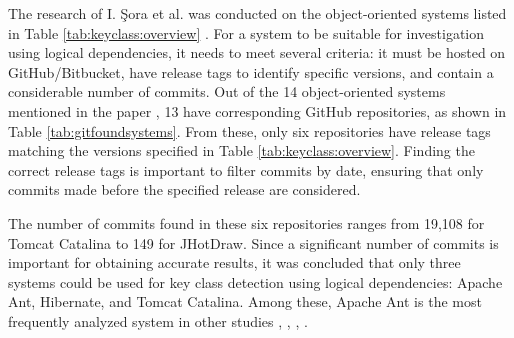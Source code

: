 \hspace{4em}The research of I. Şora et al. \cite{Finding-key-classes} was conducted on the object-oriented systems listed in Table \ref{tab:keyclass:overview} \cite{b4}. For a system to be suitable for investigation using logical dependencies, it needs to meet several criteria: it must be hosted on GitHub/Bitbucket, have release tags to identify specific versions, and contain a considerable number of commits. Out of the 14 object-oriented systems mentioned in the paper \cite{Finding-key-classes}, 13 have corresponding GitHub repositories, as shown in Table \ref{tab:gitfoundsystems}. From these, only six repositories have release tags matching the versions specified in Table \ref{tab:keyclass:overview}. Finding the correct release tags is important to filter commits by date, ensuring that only commits made before the specified release are considered.

The number of commits found in these six repositories ranges from 19,108 for Tomcat Catalina to 149 for JHotDraw. Since a significant number of commits is important for obtaining accurate results, it was concluded that only three systems could be used for key class detection using logical dependencies: Apache Ant, Hibernate, and Tomcat Catalina. Among these, Apache Ant is the most frequently analyzed system in other studies \cite{enase19}, \cite{7332515}, \cite{1402122}, \cite{Kamran2016IdentificationOC}.

